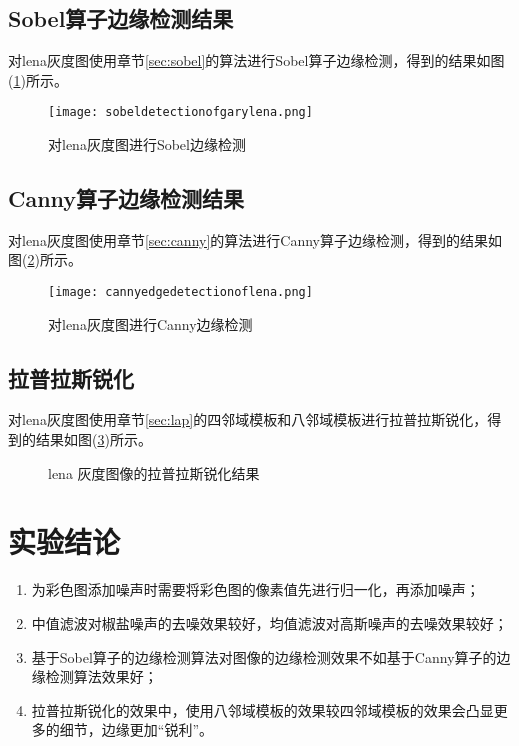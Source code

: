 \documentclass{hitreport}
\begin{document}
\subsection{Sobel算子边缘检测结果}

对lena灰度图使用章节\ref{sec:sobel}的算法进行Sobel算子边缘检测，得到的结果如图(\ref{fig:lenasobel})所示。

\begin{figure}[htb]
	\centering
	\texttt{[image: sobeldetectionofgarylena.png]}
	\caption{对lena灰度图进行Sobel边缘检测}\label{fig:lenasobel}
\end{figure}

\subsection{Canny算子边缘检测结果}

对lena灰度图使用章节\ref{sec:canny}的算法进行Canny算子边缘检测，得到的结果如图(\ref{fig:lenacanny})所示。

\begin{figure}[htb]
	\centering
	\texttt{[image: cannyedgedetectionoflena.png]}
	\caption{对lena灰度图进行Canny边缘检测}\label{fig:lenacanny}
\end{figure}

\subsection{拉普拉斯锐化}

对lena灰度图使用章节\ref{sec:lap}的四邻域模板和八邻域模板进行拉普拉斯锐化，得到的结果如图(\ref{fig:lap})所示。

\begin{figure}[htb]
	\centering
	\hspace{20pt}
	\caption{lena 灰度图像的拉普拉斯锐化结果}\label{fig:lap}
\end{figure}


\section{实验结论}

\begin{enumerate}
\item 为彩色图添加噪声时需要将彩色图的像素值先进行归一化，再添加噪声；
\item 中值滤波对椒盐噪声的去噪效果较好，均值滤波对高斯噪声的去噪效果较好；
\item 基于Sobel算子的边缘检测算法对图像的边缘检测效果不如基于Canny算子的边缘检测算法效果好；
\item 拉普拉斯锐化的效果中，使用八邻域模板的效果较四邻域模板的效果会凸显更多的细节，边缘更加“锐利”。
\end{enumerate}
\end{document}
